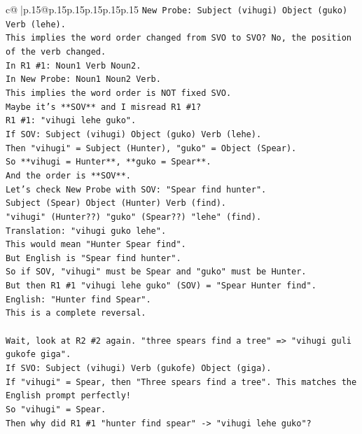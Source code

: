 \documentclass{article}
\begin{document}
{\begin{supertabular}{c@{$\;$}|p{.15\linewidth}@{}p{.15\linewidth}p{.15\linewidth}p{.15\linewidth}p{.15\linewidth}p{.15\linewidth}}
{{{\texttt{New Probe: Subject (vihugi) Object (guko) Verb (lehe).} \\
\texttt{This implies the word order changed from SVO to SVO? No, the position of the verb changed.} \\
\texttt{In R1 \#1: Noun1 Verb Noun2.} \\
\texttt{In New Probe: Noun1 Noun2 Verb.} \\
\texttt{This implies the word order is NOT fixed SVO.} \\
\texttt{Maybe it's **SOV** and I misread R1 \#1?} \\
\texttt{R1 \#1: "vihugi lehe guko".} \\
\texttt{If SOV: Subject (vihugi) Object (guko) Verb (lehe).} \\
\texttt{Then "vihugi" = Subject (Hunter), "guko" = Object (Spear).} \\
\texttt{So **vihugi = Hunter**, **guko = Spear**.} \\
\texttt{And the order is **SOV**.} \\
\texttt{Let's check New Probe with SOV: "Spear find hunter".} \\
\texttt{Subject (Spear) Object (Hunter) Verb (find).} \\
\texttt{"vihugi" (Hunter??) "guko" (Spear??) "lehe" (find).} \\
\texttt{Translation: "vihugi guko lehe".} \\
\texttt{This would mean "Hunter Spear find".} \\
\texttt{But English is "Spear find hunter".} \\
\texttt{So if SOV, "vihugi" must be Spear and "guko" must be Hunter.} \\
\texttt{But then R1 \#1 "vihugi lehe guko" (SOV) = "Spear Hunter find".} \\
\texttt{English: "Hunter find Spear".} \\
\texttt{This is a complete reversal.} \\
\\ 
\texttt{Wait, look at R2 \#2 again. "three spears find a tree" => "vihugi guli gukofe giga".} \\
\texttt{If SVO: Subject (vihugi) Verb (gukofe) Object (giga).} \\
\texttt{If "vihugi" = Spear, then "Three spears find a tree". This matches the English prompt perfectly!} \\
\texttt{So "vihugi" = Spear.} \\
\texttt{Then why did R1 \#1 "hunter find spear" {-}> "vihugi lehe guko"?} \\
}}}
\end{supertabular}}
\end{document}
